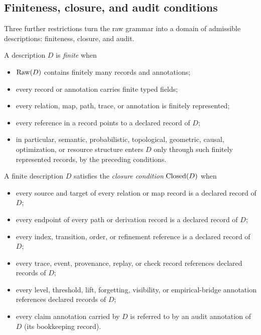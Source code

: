 \subsection{Finiteness, closure, and audit conditions}\label{subsec:conditions}

Three further restrictions turn the raw grammar into a domain of
admissible descriptions: finiteness, closure, and audit.

\begin{definition}\label{def:finite}
A description \(D\) is \emph{finite} when
\begin{itemize}[topsep=2pt,itemsep=1pt]
  \item \(\operatorname{Raw}\!\left(D\right)\) contains finitely many records and annotations;
  \item every record or annotation carries finite typed fields;
  \item every relation, map, path, trace, or annotation is finitely
    represented;
  \item every reference in a record points to a declared record of
    \(D\);
  \item in particular, semantic, probabilistic, topological, geometric,
    causal, optimization, or resource structure enters \(D\) only through
    such finitely represented records, by the preceding conditions.
\end{itemize}
\end{definition}

\begin{definition}\label{def:closed}
A finite description \(D\) satisfies the \emph{closure condition} \(\operatorname{Closed}\!\left(D\right)\)
when
\begin{itemize}[topsep=2pt,itemsep=1pt]
  \item every source and target of every relation or map record is a declared
    record of \(D\);
  \item every endpoint of every path or derivation record is a declared record
    of \(D\);
  \item every index, transition, order, or refinement reference is a declared
    record of \(D\);
  \item every trace, event, provenance, replay, or check record references
    declared records of \(D\);
  \item every level, threshold, lift, forgetting, visibility, or
    empirical-bridge annotation references declared records of \(D\);
  \item every claim annotation carried by \(D\) is referred to by an audit annotation
    of \(D\) (its bookkeeping record).
\end{itemize}
\end{definition}

